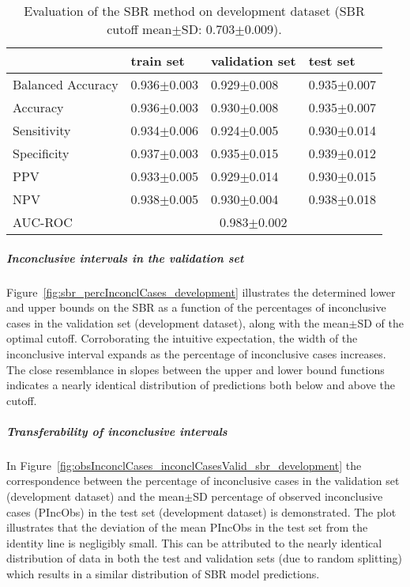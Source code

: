 \begin{table}[ht]
  \caption{Evaluation of the SBR method on development dataset (SBR cutoff mean$\pm$SD: 0.703$\pm$0.009).}
  \centering
  \begin{tabular}{llll}
      \hline
                        & train set         & validation set      & test set             \\
      \hline
      Balanced Accuracy & 0.936$\pm$0.003   &   0.929$\pm$0.008   &  0.935$\pm$0.007     \\
      Accuracy          & 0.936$\pm$0.003   &   0.930$\pm$0.008   &  0.935$\pm$0.007     \\
      Sensitivity       &  0.934$\pm$0.006  &   0.924$\pm$0.005   &  0.930$\pm$0.014     \\
      Specificity       & 0.937$\pm$0.003   &   0.935$\pm$0.015   &  0.939$\pm$0.012     \\
      PPV               &  0.933$\pm$0.005  &   0.929$\pm$0.014   &  0.930$\pm$0.015     \\
      NPV               &  0.938$\pm$0.005  &   0.930$\pm$0.004   &  0.938$\pm$0.018     \\
      \hline
      AUC-ROC          &  \multicolumn{3}{c}{0.983$\pm$0.002 }  \\
      \hline
  \end{tabular}
 \label{t1:sbr_perf_eval_table}
\end{table}

\subparagraph{Inconclusive intervals in the validation set}

Figure~\ref{fig:sbr_percInconclCases_development} illustrates the determined lower and upper bounds on the SBR 
as a function of the percentages of inconclusive cases in the validation set (development dataset), 
along with the mean$\pm$SD of the optimal cutoff.
Corroborating the intuitive expectation, the width of the inconclusive interval expands 
as the percentage of inconclusive cases increases.
The close resemblance in slopes between the upper and lower bound functions 
indicates a nearly identical distribution of predictions both below and above the cutoff.

\subparagraph{Transferability of inconclusive intervals}

In Figure~\ref{fig:obsInconclCases_inconclCasesValid_sbr_development} the correspondence between 
the percentage of inconclusive cases in the validation set (development dataset) and 
the mean$\pm$SD percentage of observed inconclusive cases (PIncObs) in the test set (development dataset) is demonstrated.
The plot illustrates that the deviation of the mean PIncObs in the test set from the 
identity line is negligibly small.
This can be attributed to the nearly identical distribution of data in both the test and validation sets 
(due to random splitting) which results in a similar distribution of SBR model predictions.


